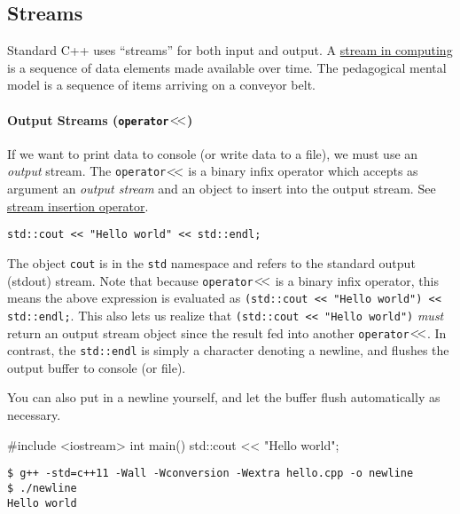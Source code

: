 \documentclass[12pt,letterpaper,twoside]{article}
\begin{document}
\subsection{Streams}
Standard C++ uses ``streams'' for both input and output.
A \href{https://en.wikipedia.org/wiki/Stream_(computing)}{stream in
  computing} is a sequence of data elements made available over time.
The pedagogical mental model is a sequence of items arriving on a
conveyor belt.

\vspace{-3ex}
\paragraph{Output Streams (\texttt{operator$<\hspace{-2pt}<$})} If we want to print data to console (or
write data to a file), we must use an \emph{output} stream.
The \texttt{operator$<\hspace{-2pt}<$} is a binary infix operator which accepts as
argument an \emph{output stream}
and an object to insert into the output stream.
See \href{https://en.cppreference.com/w/cpp/io/basic_ostream/operator_ltlt}
{stream insertion operator}.

\begin{verbatim}
std::cout << "Hello world" << std::endl;
\end{verbatim}

The object \texttt{cout} is in the \texttt{std} namespace and refers to the
standard output (stdout) stream.
Note that because \texttt{operator$<\hspace{-2pt}<$} is a binary infix operator,
this means the above expression is evaluated as
\texttt{(std::cout << "Hello world") << std::endl;}. This also lets us
realize that \texttt{(std::cout << "Hello world")} \emph{must} return
an output stream object since the result fed into another
\texttt{operator$<\hspace{-2pt}<$}. In contrast, the \texttt{std::endl} is simply
a character denoting a newline, and flushes the output buffer to
console (or file).

You can also put in a newline yourself, and let the buffer flush
automatically as necessary.

\begin{cpp}
#include <iostream>
int main() { std::cout << "Hello world\n"; }
\end{cpp}

\begin{verbatim}
$ g++ -std=c++11 -Wall -Wconversion -Wextra hello.cpp -o newline
$ ./newline
Hello world
\end{verbatim}
\end{document}
